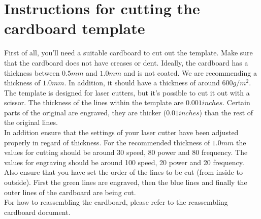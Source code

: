 \documentclass[../../Hardware_Guide]{subfiles}
\begin{document}
\chapter{Instructions for cutting the cardboard template}\label{cutterchapter}
First of all, you'll need a suitable cardboard to cut out the template. Make sure that the cardboard does not have creases or dent. Ideally, the cardboard has a thickness between $0.5 mm$ and $1.0 mm$ and is not coated. We are recommending a thickness of $1.0 mm$. In addition, it should have a thickness of around $600 g/m^2$. \\
The template is designed for laser cutters, but it's possible to cut it out with a scissor. The thickness of the lines within the template are $0.001 inches$. Certain parts of the original are engraved, they are thicker ($0.01 inches$) than the rest of the original lines. \\
In addition ensure that the settings of your laser cutter have been adjusted properly in regard of thickness. For the recommended thickness of $1.0 mm$ the values for cutting should be around 30 speed, 80 power and 80 frequency. The values for engraving should be around 100 speed, 20 power and 20 frequency.\\
Also ensure that you have set the order of the lines to be cut (from inside to outside). First the green lines are engraved, then the blue lines and finally the outer lines of the cardboard are being cut.\\
For how to reassembling the cardboard, please refer to the reassembling cardboard document.
\end{document}
